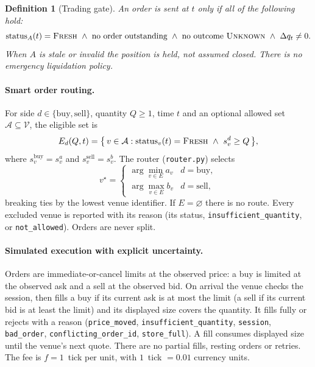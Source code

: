 \documentclass[11pt]{article}
\newtheorem{definition}{Definition}
\theoremstyle{remark}
\newcommand{\Venues}{\mathcal{V}}
\newcommand{\code}[1]{\texttt{#1}}
\begin{document}
\begin{definition}[Trading gate]
An order is sent at $t$ only if all of the following hold:
\[
  \mathrm{status}_A(t) = \textsc{Fresh}
  \ \wedge\ \text{no order outstanding}
  \ \wedge\ \text{no outcome } \textsc{Unknown}
  \ \wedge\ \Delta q_t \neq 0 .
\]
When $A$ is stale or invalid the position is \emph{held}, not assumed closed. There is no
emergency liquidation policy.
\end{definition}

\paragraph{Smart order routing.}

For side $d \in \{\text{buy}, \text{sell}\}$, quantity $Q \ge 1$, time $t$ and an optional
allowed set $\mathcal{A} \subseteq \Venues$, the eligible set is
\begin{equation}
  E_d(Q, t) = \bigl\{\, v \in \mathcal{A} :
     \mathrm{status}_v(t) = \textsc{Fresh}\ \wedge\ s_v^{d} \ge Q \,\bigr\},
\end{equation}
where $s_v^{\text{buy}} = s^a_v$ and $s_v^{\text{sell}} = s^b_v$. The router (\code{router.py})
selects
\begin{equation}
  v^\star =
  \begin{cases}
    \arg\min_{v \in E} a_v & d = \text{buy},\\
    \arg\max_{v \in E} b_v & d = \text{sell},
  \end{cases}
\end{equation}
breaking ties by the lowest venue identifier. If $E = \varnothing$ there is no route. Every
excluded venue is reported with its reason (its status, \code{insufficient\_quantity}, or
\code{not\_allowed}). Orders are never split.

\paragraph{Simulated execution with explicit uncertainty.}

Orders are immediate-or-cancel limits at the observed price: a buy is limited at the observed
ask and a sell at the observed bid. On arrival the venue checks the session, then fills a buy if
its current ask is at most the limit (a sell if its current bid is at least the limit) and its
displayed size covers the quantity. It fills fully or rejects with a reason
(\code{price\_moved}, \code{insufficient\_quantity}, \code{session}, \code{bad\_order},
\code{conflicting\_order\_id}, \code{store\_full}). A fill consumes displayed size until the
venue's next quote. There are no partial fills, resting orders or retries. The fee is
$f = 1$~tick per unit, with $1$~tick $= 0.01$ currency units.
\end{document}
